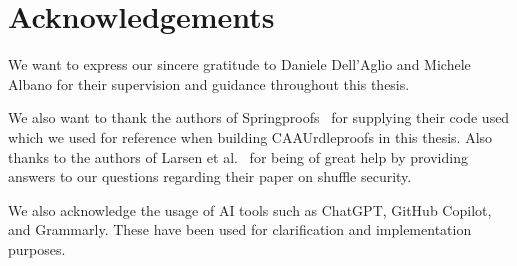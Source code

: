 

\section{Acknowledgements}\label{sec:acknowledgements}
We want to express our sincere gratitude to Daniele Dell'Aglio and Michele Albano for their supervision and guidance throughout this thesis.

We also want to thank the authors of Springproofs~\cite{zhang2024springproofs} for supplying their code used which we used for reference when building CAAUrdleproofs in this thesis.
Also thanks to the authors of Larsen et al.~\cite{cryptoeprint:2022/560} for being of great help by providing answers to our questions regarding their paper on shuffle security.

We also acknowledge the usage of AI tools such as ChatGPT, GitHub Copilot, and Grammarly.
These have been used for clarification and implementation purposes.